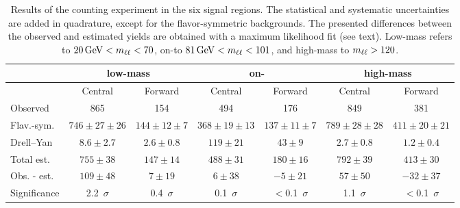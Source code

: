 
\begin{table}[btp]
 \renewcommand{\arraystretch}{1.3}
 \setlength{\belowcaptionskip}{6pt}
 \scriptsize
 \centering
 \caption{Results of the counting experiment in the six signal regions.
     The statistical and systematic uncertainties are added in quadrature, except for the flavor-symmetric backgrounds. The presented differences between the observed and estimated yields are obtained with a maximum likelihood fit (see text).    Low-mass refers to $20\,\mathrm{Ge\hspace{-.08em}V} < m_{\ell\ell} < 70$\GeV, on-\Z to  $81\,\mathrm{Ge\hspace{-.08em}V} < m_{\ell\ell} < 101$\GeV, and high-mass to $m_{\ell\ell} > 120$\GeV.
     }
  \label{tab:METresults2012}
  \begin{tabular}{l| cc | cc | cc}

    							& \multicolumn{2}{c}{low-mass} & \multicolumn{2}{c}{on-\Z} & \multicolumn{2}{c}{high-mass} \\ 

    \hline
                                &  Central        & Forward  &  Central  & Forward   &  Central        & Forward \\ 

    \hline
        Observed       &  865                   & 154              &  494            &  176       &   849           &   381    \\

    \hline
        Flav.-sym.    & $746\pm27\pm26$        & $144\pm12\pm7$  &  $368\pm19\pm13$ & $137\pm11\pm7$ & $789\pm28\pm28$ & $411\pm20\pm21$ \\

            Drell--Yan          & $8.6\pm2.7$            & $2.6\pm0.8$      & $119\pm21$ & $43\pm9$ & $2.7\pm0.8$ & $1.2\pm0.4$ \\

    \hline
            Total est.          & $755\pm38$            & $147\pm14$      & $488\pm31$ & $180\pm16$ & $792\pm39$ & $413\pm30$ \\

    \hline
         Obs. - est.  & $109\pm48$      & $7\pm19$ & $6\pm38 $ & $-5\pm21$ & $57\pm50$ & $-32\pm37 $ \\ 

    \hline
   Significance      & 2.2~$\sigma$    &  0.4~$\sigma$  & 0.1~$\sigma$ & $<$0.1~$\sigma$ & 1.1~$\sigma$ & $<$0.1~$\sigma$ \\ 


  \end{tabular}
\end{table}


